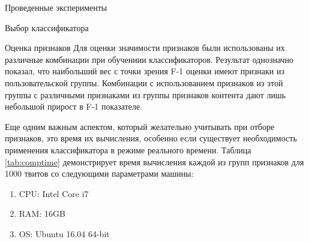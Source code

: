 \begin{section}{Проведенные эксперименты}
\begin{subsection}{Выбор классификатора}
\begin{table}[H]
\centering
{}

\caption{Сравнение показателей классификатора}
\label{tab:results}
\end{table}



\end{subsection}


\begin{subsection}{Оценка признаков}
Для оценки значимости признаков были использованы их различные комбинации  при обучениии классификаторов. Результат однозначно показал, что наибольший вес с точки зрения F-1 оценки имеют признаки из пользовательской группы. Комбинации с использованием признаков из этой группы с различными признаками из группы признаков контента дают лишь небольшой прирост в F-1 показателе.

Еще одним важным аспектом, который желательно учитывать при отборе признаков, это время их вычисления, особенно если существует необходимость применения классификатора в режиме реального времени. Таблица \ref{tab:comptime} демонстрирует время вычисления каждой из групп признаков для 1000 твитов со следующими параметрами машины:
\begin{enumerate}
\item CPU: Intel Core i7
\item RAM: 16GB
\item OS: Ubuntu 16.04 64-bit
\end{enumerate}



\begin{table}[H]
\centering
{}


\end{table}
\end{subsection}
\end{section}
